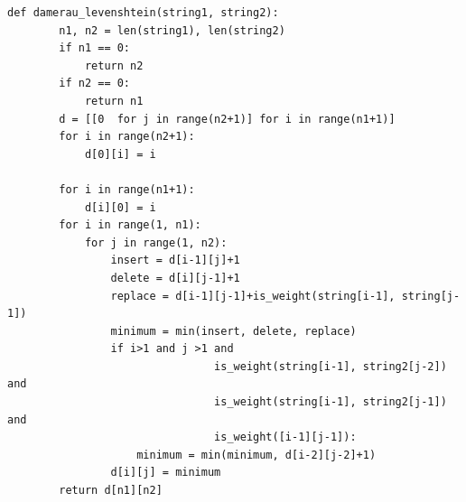 \documentclass[a4paper]{article}
\begin{document}
	\clearpage
	\begin{lstlisting}[label=damerau-leven,caption= Алгоритм для нахождения расстояния Дамерау-Левенштейна(итеративная реализация)]
		def damerau_levenshtein(string1, string2):
		n1, n2 = len(string1), len(string2)
		if n1 == 0:
			return n2
		if n2 == 0:
			return n1
		d = [[0  for j in range(n2+1)] for i in range(n1+1)]
		for i in range(n2+1):
			d[0][i] = i
		
		for i in range(n1+1):
			d[i][0] = i
		for i in range(1, n1):
			for j in range(1, n2):
				insert = d[i-1][j]+1
				delete = d[i][j-1]+1
				replace = d[i-1][j-1]+is_weight(string[i-1], string[j-1])
				minimum = min(insert, delete, replace)
				if i>1 and j >1 and
								is_weight(string[i-1], string2[j-2]) and
								is_weight(string[i-1], string2[j-1]) and
								is_weight([i-1][j-1]):
					minimum = min(minimum, d[i-2][j-2]+1)
				d[i][j] = minimum
		return d[n1][n2]
	\end{lstlisting}
	\clearpage 
	
\end{document}
